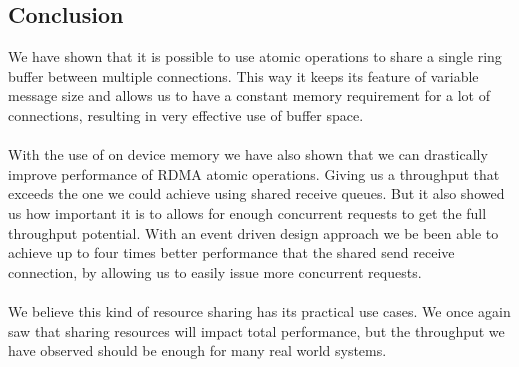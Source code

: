 \subsection{Conclusion}

We have shown that it is possible to use atomic operations to share a single ring buffer between multiple connections. This
way it keeps its feature of variable message size and allows us to have a constant memory requirement for a lot of connections,
resulting in very effective use of buffer space.

\paragraph{} With the use of on device memory we have also shown that we can drastically improve performance of RDMA atomic 
operations. Giving us a throughput that exceeds the one we could achieve using shared receive queues. But it 
also showed us how important it is to allows for enough concurrent requests to get the full throughput potential. 
With an event driven design approach we be been able to achieve up to four times better performance that the shared
send receive connection, by allowing us to easily issue more concurrent requests.

\paragraph{} We believe this kind of resource sharing has its practical use cases. We once again saw that sharing resources
will impact total performance, but the throughput we have observed should be enough for many real world systems. 
